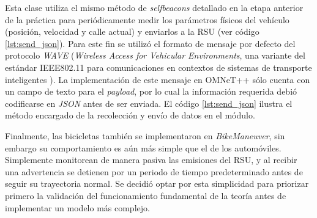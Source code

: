 \documentclass[11pt,letterpaper]{article}
\begin{document}
\begin{description}[leftmargin=!,labelwidth=\widthof{\bfseries Automóviles}]
	Esta clase utiliza el mismo método de \emph{selfbeacons} detallado en la etapa anterior de la práctica para periódicamente medir los parámetros físicos del vehículo (posición, velocidad y calle actual) y enviarlos a la RSU (ver código \ref{lst:send_json}). Para este fin se utilizó el formato de mensaje por defecto del protocolo \emph{WAVE} (\emph{Wireless Access for Vehicular Environments}, una variante del estándar IEEE802.11 para comunicaciones en contextos de sistemas de transporte inteligentes \cite{80211wave}). La implementación de este mensaje en OMNeT++ sólo cuenta con un campo de texto para el \emph{payload}, por lo cual la información requerida debió codificarse en \emph{JSON} antes de ser enviada. El código \ref{lst:send_json} ilustra el método encargado de la recolección y envío de datos en el módulo.
	\item [Bicicletas]	Finalmente, las bicicletas también se implementaron en \emph{BikeManeuver}, sin embargo su comportamiento es aún más simple que el de los automóviles. Simplemente monitorean de manera pasiva las emisiones del RSU, y al recibir una advertencia se detienen por un periodo de tiempo predeterminado antes de seguir su trayectoria normal. Se decidió optar por esta simplicidad para priorizar primero la validación del funcionamiento fundamental de la teoría antes de implementar un modelo más complejo.
\end{description}
\end{document}
